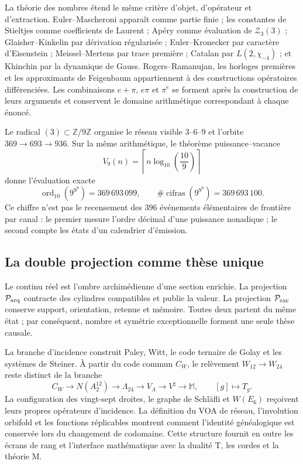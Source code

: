 La théorie des nombres étend le même critère d'objet, d'opérateur et
d'extraction. Euler--Mascheroni apparaît comme partie finie ; les constantes de
Stieltjes comme coefficients de Laurent ; Apéry comme évaluation de
\(\mathcal Z_3(3)\) ; Glaisher--Kinkelin par dérivation régularisée ;
Euler--Kronecker par caractère d'Eisenstein ; Meissel--Mertens par
trace première ; Catalan par \(L(2,\chi_{-4})\) ; et Khinchin par la
dynamique de Gauss. Rogers--Ramanujan, les horloges premières et les approximants
de Feigenbaum appartiennent à des constructions opératoires différenciées. Les
combinaisons \(e+\pi\), \(e\pi\) et \(\pi^e\) se forment après la construction de
leurs arguments et conservent le domaine arithmétique correspondant à chaque
énoncé.

Le radical \((3)\subset\mathbb Z/9\mathbb Z\) organise le réseau visible
\(3\)--\(6\)--\(9\) et l'orbite \(369\to693\to936\). Sur la même
arithmétique, le théorème puissance--vacance
\[
 V_9(n)=\left\lceil n\log_{10}\!\left(\frac{10}{9}\right)\right\rceil
\]
donne l'évaluation exacte
\[
 \operatorname{ord}_{10}\!\left(9^{9^9}\right)=369\,693\,099,
 \qquad
 \#\operatorname{cifras}\!\left(9^{9^9}\right)=369\,693\,100.
\]
Ce chiffre n'est pas le recensement des \(396\) événements élémentaires de frontière par
canal : le premier mesure
l'ordre décimal d'une puissance nonadique ; le second compte les états d'un
calendrier d'émission.

\subsection*{La double projection comme thèse unique}

Le continu réel est l'ombre archimédienne d'une section enrichie. La
projection \(\mathcal P_{\rm arq}\) contracte des cylindres compatibles et publie
la valeur. La projection \(\mathcal P_{\rm exc}\) conserve support,
orientation, retenue et mémoire. Toutes deux partent du même état ; par conséquent,
nombre et symétrie exceptionnelle forment une seule thèse causale.

La branche d'incidence construit Paley, Witt, le code ternaire de Golay et
les systèmes de Steiner. À partir du code commun \(C_W\), le relèvement
\(W_{12}\to W_{24}\) reste distinct de la branche
\[
 C_W\to N(A_2^{12})\to\Lambda_{24}\to
 V_\Lambda\to V^\natural\to\mathbb M,
 \qquad [g]\longmapsto T_g.
\]
La configuration des vingt-sept droites, le graphe de Schläfli et
\(W(E_6)\) reçoivent leurs propres opérateurs d'incidence. La définition du
VOA de réseau, l'involution orbifold et les fonctions réplicables montrent
comment l'identité généalogique est conservée lors du changement de codomaine. Cette
structure fournit en outre les écrans de rang et l'interface
mathématique avec la dualité T, les cordes et la théorie M.

